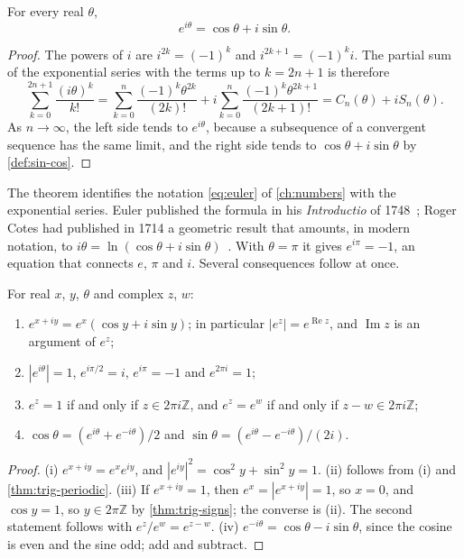 \begin{theorem}
\label{thm:euler-formula}
For every real $\theta$,
\[
e^{i\theta}=\cos\theta+i\sin\theta .
\]
\end{theorem}

\begin{proof}
The powers of $i$ are $i^{2k}=(-1)^k$ and $i^{2k+1}=(-1)^ki$. The partial sum of the exponential series with the terms up to $k=2n+1$ is therefore
\[
\sum_{k=0}^{2n+1}\frac{(i\theta)^k}{k!}=\sum_{k=0}^n\frac{(-1)^k\theta^{2k}}{(2k)!}+i\sum_{k=0}^n\frac{(-1)^k\theta^{2k+1}}{(2k+1)!}=C_n(\theta)+iS_n(\theta).
\]
As $n\to\infty$, the left side tends to $e^{i\theta}$, because a subsequence of a convergent sequence has the same limit, and the right side tends to $\cos\theta+i\sin\theta$ by \cref{def:sin-cos}.
\end{proof}

The theorem identifies the notation \eqref{eq:euler} of \cref{ch:numbers} with the exponential series. Euler published the formula in his \emph{Introductio} of 1748~\cite{euler1748introductio}; Roger Cotes had published in 1714 a geometric result that amounts, in modern notation, to $i\theta=\ln(\cos\theta+i\sin\theta)$~\cite{cotes1714,maor1994}. With $\theta=\pi$ it gives $e^{i\pi}=-1$, an equation that connects $e$, $\pi$ and $i$. Several consequences follow at once.

\begin{corollary}
\label{cor:euler-consequences}
For real $x$, $y$, $\theta$ and complex $z$, $w$:
\begin{enumerate}
\item $e^{x+iy}=e^x(\cos y+i\sin y)$; in particular $|e^z|=e^{\operatorname{Re}z}$, and $\operatorname{Im}z$ is an argument of $e^z$;
\item $|e^{i\theta}|=1$, $e^{i\pi/2}=i$, $e^{i\pi}=-1$ and $e^{2\pi i}=1$;
\item $e^z=1$ if and only if $z\in2\pi i\mathbb Z$, and $e^z=e^w$ if and only if $z-w\in2\pi i\mathbb Z$;
\item $\cos\theta=(e^{i\theta}+e^{-i\theta})/2$ and $\sin\theta=(e^{i\theta}-e^{-i\theta})/(2i)$.
\end{enumerate}
\end{corollary}

\begin{proof}
(i) $e^{x+iy}=e^xe^{iy}$, and $|e^{iy}|^2=\cos^2y+\sin^2y=1$. (ii) follows from (i) and \cref{thm:trig-periodic}. (iii) If $e^{x+iy}=1$, then $e^x=|e^{x+iy}|=1$, so $x=0$, and $\cos y=1$, so $y\in2\pi\mathbb Z$ by \cref{thm:trig-signs}; the converse is (ii). The second statement follows with $e^z/e^w=e^{z-w}$. (iv) $e^{-i\theta}=\cos\theta-i\sin\theta$, since the cosine is even and the sine odd; add and subtract.
\end{proof}

